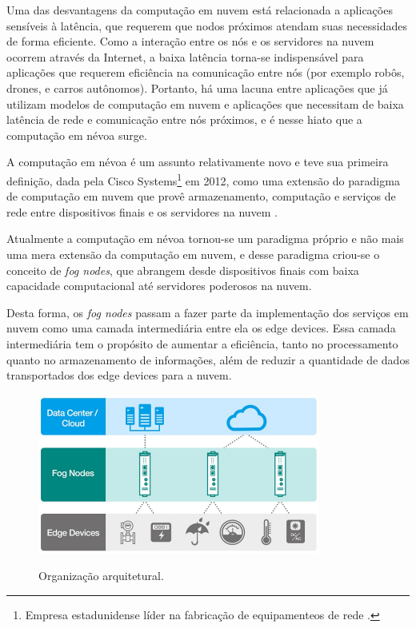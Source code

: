 Uma das desvantagens da computação em nuvem está relacionada a aplicações sensíveis à latência, que requerem que nodos próximos atendam suas necessidades de forma eficiente. 
Como a interação entre os nós e os servidores na nuvem ocorrem através da Internet, a baixa latência torna-se indispensável para aplicações que requerem eficiência na comunicação entre nós (por exemplo robôs, drones, e carros autônomos).
Portanto, há uma lacuna entre aplicações que já utilizam modelos de computação em nuvem e aplicações que necessitam de baixa latência de rede e comunicação entre nós próximos, e é nesse hiato que a computação em névoa surge.

A computação em névoa é um assunto relativamente novo e teve sua primeira definição, dada pela Cisco Systems\footnote{Empresa estadunidense líder na fabricação de equipamenteos de rede \cite{ciscoSystems}.} em 2012, como uma extensão do paradigma de computação em nuvem que provê armazenamento, computação e serviços de rede entre dispositivos finais e os servidores na nuvem \cite{DBLP:journals/corr/RomanLM16}. 

Atualmente a computação em névoa tornou-se um paradigma próprio e não mais uma mera extensão da computação em nuvem, e desse
paradigma criou-se o conceito de \textit{fog nodes}, que abrangem desde dispositivos finais com baixa capacidade computacional até servidores poderosos na nuvem.

Desta forma, os \textit{fog nodes} passam a fazer parte da implementação dos serviços em nuvem como uma camada intermediária entre ela os edge devices.
Essa camada intermediária tem o propósito de aumentar a eficiência, tanto no processamento quanto no armazenamento de informações, além de reduzir a quantidade de dados transportados dos edge devices para a nuvem\cite{fogdefinition:2016}.


\begin{figure}[htb!]
    \centering\includegraphics[width=.5\textwidth]{fig1.pdf}
    \caption [Organização arquitetural]
    {\label{fig:fig1} Organização arquitetural.} \cite{archfog:2017}
\end{figure}

